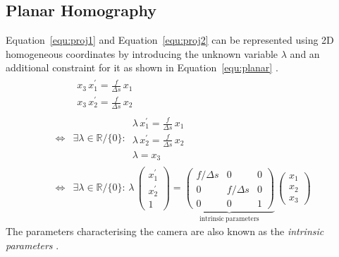\documentclass[12pt,a4paper,oneside,openright]{book}
\newcommand{\equ}[1]{Equation~\ref{equ:#1}}
\begin{document}
\begin{CJK}{UTF8}{}
\section{Planar Homography}\label{cha:planar}
\equ{proj1} and \equ{proj2} can be represented using \ac{2D} homogeneous coordinates by introducing the unknown variable $\lambda$ and an additional constraint for it as shown in \equ{planar} \citep{zhang2000flexible}.
\begin{equation}
  \begin{split}
    &\begin{matrix}x_3\,x^\prime_1=\displaystyle\frac{f}{\Delta s}\,x_1\\
      x_3\,x^\prime_2=\displaystyle\frac{f}{\Delta s}\,x_2\end{matrix}\\
    \Leftrightarrow&\exists\lambda\in\mathbb{R}/\{0\}:\,
    \begin{matrix}\lambda\,x^\prime_1=\displaystyle\frac{f}{\Delta s}\,x_1\\
      \lambda\,x^\prime_2=\displaystyle\frac{f}{\Delta s}\,x_2\\
      \lambda=x_3\end{matrix}\\
    \Leftrightarrow&\exists\lambda\in\mathbb{R}/\{0\}:\,\lambda\,\begin{pmatrix}x^\prime_1\\x^\prime_2\\1\end{pmatrix}=
    \underbrace{\begin{pmatrix}f/\Delta s&0&0\\0&f/\Delta s&0\\0&0&1\end{pmatrix}}_{\mathrm{intrinsic\ parameters}}\,
    \begin{pmatrix}x_1\\x_2\\x_3\end{pmatrix}
  \end{split}\label{equ:planar}
\end{equation}
The parameters characterising the camera are also known as the \emph{intrinsic parameters} \citep{zhang2000flexible}.


\end{CJK}
\end{document}
